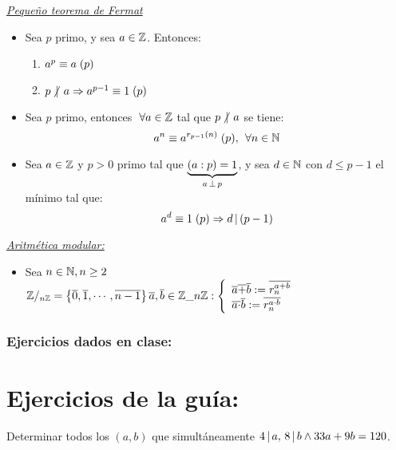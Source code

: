\documentclass[12pt,a4paper, spanish]{article}
\begin{document}
\textit{\underline{Pequeño teorema de Fermat}}
\begin{itemize}
  \item Sea $p$ primo, y sea $a \en \enteros$. Entonces:
    \begin{enumerate}[label=\arabic*.)]
        \item $ \congruencia{a^p}{a}{p} $
        \item $ p \noDivide a \entonces \congruencia{a^{p-1}}{1}{p} $
      \end{enumerate}
  \item Sea $p$ primo, entonces $ \paratodo a \en \enteros$ tal que $ p \noDivide a$ se tiene:
    \[
      \congruencia{a^n}{a^{r_{p-1}(n)}}{p} ,\, \paratodo n \en \naturales 
    \]
  \item Sea $a \en \enteros$ y $p > 0$ primo tal que $\ub{(a:p) = 1}{a \cop p}$, y sea  $d \en \naturales$ con $d \leq p-1$
    el mínimo tal que:
    \[
      \congruencia{a^d}{1}{p} \entonces d \divide (p-1)
    \]  
\end{itemize}
\textit{\underline{Aritmética modular:}}
\begin{itemize}
  \item Sea $n \en \naturales, n\geq2$\\
    $
      \enteros/_{n\enteros} = \set{\clase{0},\clase{1},\cdots, \clase{n-1} }\\
      \clase{a},\clase{b} \en \enteros\_{n\enteros}:
      \llave{l}{
        \clase{a} \clase{+} \clase{b} := \overline{r_n^{a+b}} \\
        \clase{a} \clase{\cdot} \clase{b} := \overline{r_n^{a\cdot b}}
      }
    $
\end{itemize}



\subsubsection*{Ejercicios dados en clase:}

\newpage


\section*{Ejercicios de la guía:}
\setcounter{ejercicio}{0} %
\ejercicio

\ejercicio
Determinar todos los $(a,b)$ que simultáneamente $4 \divide a,\, 8 \divide b \y 33a + 9b = 120$.
\end{document}
